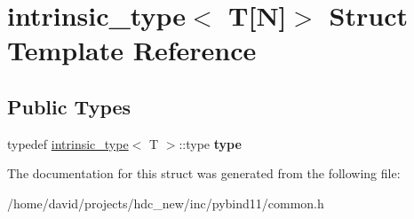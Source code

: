 \hypertarget{structintrinsic__type_3_01_t[_n]_4}{}\section{intrinsic\+\_\+type$<$ T\mbox{[}N\mbox{]}$>$ Struct Template Reference}
\label{structintrinsic__type_3_01_t[_n]_4}
\subsection*{Public Types}
\begin{DoxyCompactItemize}
\item 
typedef \hyperlink{structintrinsic__type}{intrinsic\+\_\+type}$<$ T $>$\+::type {\bfseries type}\hypertarget{structintrinsic__type_3_01_t[_n]_4_a1293e367b8af022bba0150ff1b991c7b}{}\label{structintrinsic__type_3_01_t[_n]_4_a1293e367b8af022bba0150ff1b991c7b}

\end{DoxyCompactItemize}


The documentation for this struct was generated from the following file\+:\begin{DoxyCompactItemize}
\item 
/home/david/projects/hdc\+\_\+new/inc/pybind11/common.\+h\end{DoxyCompactItemize}
